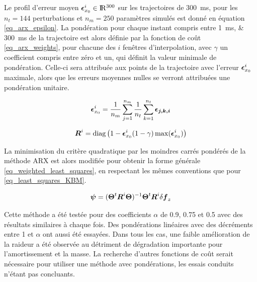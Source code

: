 Le profil d'erreur moyen $\vect{\epsilon}_{x_0}^{i} \in \Re^{300}$ sur les trajectoires de \SI{300}{\milli\second}, pour les $n_t=144$ perturbations et $n_m=250$ paramètres simulés est donné en équation \cref{eq_arx_epsilon}. La pondération pour chaque instant compris entre \SIlist{1;300}{\milli\second} de la trajectoire est alors définie par la fonction de coût \cref{eq_arx_weights}, pour chacune des $i$ fenêtres d'interpolation, avec $\gamma$ un coefficient compris entre zéro et un, qui définit la valeur minimale de pondération. Celle-ci sera attribuée aux points de la trajectoire avec l'erreur $\vect{\epsilon}_{x_0}^{i}$ maximale, alors que les erreurs moyennes nulles se verront attribuées une pondération unitaire.%

\begin{equation} \label{eq_arx_epsilon}
	\vect{\epsilon}_{x_0}^{i} = \frac{1}{n_m}\sum_{j=1}^{n_m} \frac{1}{n_t}\sum_{k=1}^{n_t} \vect{\epsilon_{j,k,i}}
\end{equation}

\begin{equation} \label{eq_arx_weights}
	\matr{R}^{i} = \text{diag}\left( 1 - \vect{\epsilon}_{x_0}^{i} (1 - \gamma)\max(\vect{\epsilon}_{x_0}^{i}) \right)
\end{equation}

La minimisation du critère quadratique par les moindres carrés pondérés de la méthode ARX est alors modifiée pour obtenir la forme générale \cref{eq_weighted_least_squares}, en respectant les mêmes conventions que pour \cref{eq_least_squares_KBM}.

\begin{equation} \label{eq_weighted_least_squares}
	\vect{\psi} = (\matr{\Theta}^t\matr{R}^{i}\matr{\Theta})^{-1}\matr{\Theta}^t\matr{R}^{i}\delta\vect{f}_z
\end{equation}

Cette méthode a été testée pour des coefficients $\alpha$ de 0.9, 0.75 et 0.5 avec des résultats similaires à chaque fois. Des pondérations linéaires avec des décréments entre 1 et $\alpha$ ont aussi été essayées. Dans tous les cas, une faible amélioration de la raideur a été observée au détriment de dégradation importante pour l'amortissement et la masse. La recherche d'autres fonctions de coût serait nécessaire pour utiliser une méthode avec pondérations, les essais conduits n'étant pas concluants.

